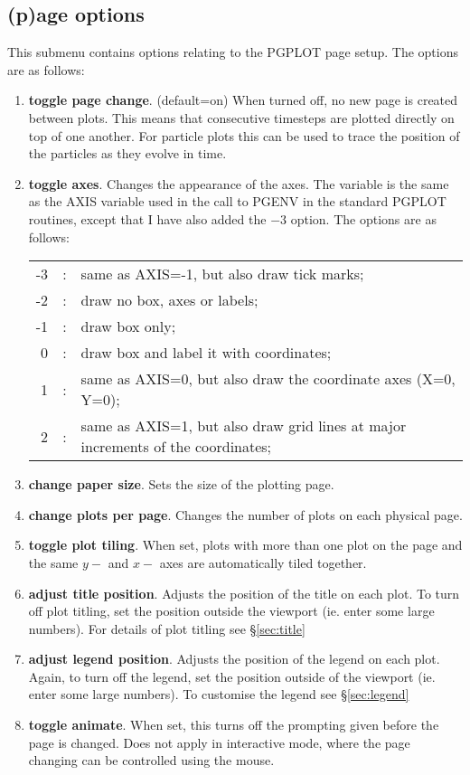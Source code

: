 \documentclass[a4paper,12pt]{article}
\begin{document}
\subsection{(p)age options}
\label{sec:optionspage}
 This submenu contains options relating to the PGPLOT page setup. The options are as follows:
\begin{enumerate}
\item \textbf{toggle page change}. (default=on) When turned off, no new page is
created between plots. This means that consecutive timesteps are plotted
directly on top of one another. For particle plots this can be used to trace the
position of the particles as they evolve in time.
\item \textbf{toggle axes}. Changes the appearance of the axes. The variable is
the same as the AXIS variable used in the call to PGENV in the standard PGPLOT
routines, except that I have also added the $-3$ option. The options are
as follows:

\begin{tabular}{rcp{}}
-3 & : & same as AXIS=-1, but also draw tick marks; \\
 -2 & : & draw no box, axes or labels; \\
 -1 & : & draw box only; \\
  0 & : & draw box and label it with coordinates; \\
  1 & : & same as AXIS=0, but also draw the coordinate axes (X=0, Y=0); \\
  2 & : & same as AXIS=1, but also draw grid lines at major increments of the coordinates;
\end{tabular}

\item \textbf{change paper size}. Sets the size of the plotting page.
\item \textbf{change plots per page}. Changes the number of plots on each
physical page.
\item \textbf{toggle plot tiling}. When set, plots with more than one plot on
the page and the same $y-$ and $x-$ axes are automatically tiled together.
\item \textbf{adjust title position}. Adjusts the position of the title on
each plot. To turn off plot titling, set the position outside the viewport (ie.
enter some large numbers). For details of plot titling see \S\vref{sec:title}
\item \textbf{adjust legend position}. Adjusts the position of the legend on
each plot. Again, to turn off the legend, set the position outside of the
viewport (ie. enter some large numbers). To customise the legend see
\S\vref{sec:legend}
\item \textbf{toggle animate}. When set, this turns off the prompting given
before the page is changed. Does not apply in interactive mode, where the page
changing can be controlled using the mouse. 
\end{enumerate}
\end{document}
